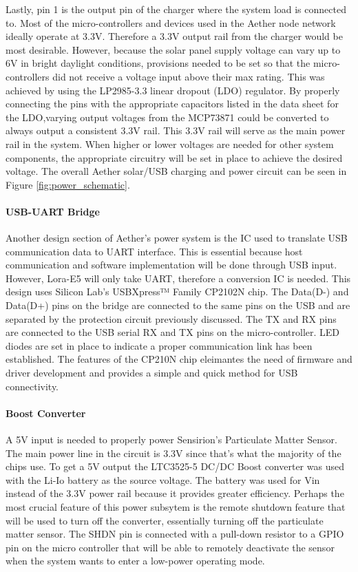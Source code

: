 Lastly, pin 1 is the output pin of the charger where the system load is connected to. Most of the micro-controllers and devices used in the Aether node network ideally operate at 3.3V. Therefore a 3.3V output rail from the charger would be most desirable. However, because the solar panel supply voltage can vary up to 6V in bright daylight conditions, provisions needed to be set so that the micro-controllers did not receive a voltage input above their max rating. This was achieved by using the LP2985-3.3 linear dropout (LDO) regulator. By properly connecting the pins with the appropriate capacitors listed in the data sheet for the LDO,varying output voltages from the MCP73871 could be converted to always output a consistent 3.3V rail. This 3.3V rail will serve as the main power rail in the system. When higher or lower voltages are needed for other system components, the appropriate circuitry will be set in place to achieve the desired voltage. The overall Aether solar/USB charging and power circuit can be seen in Figure \ref{fig:power_schematic}.
\paragraph{USB-UART Bridge}
Another design section of Aether's power system is the IC used to translate USB communication data to UART interface. This is essential because host communication and software implementation will be done through USB input. However, Lora-E5 will only take UART, therefore a conversion IC is needed. This design uses Silicon Lab's USBXpress™ Family CP2102N chip. The Data(D-) and Data(D+) pins on the bridge are connected to the same pins on the USB and are separated by the protection circuit previously discussed. The TX and RX pins are connected to the USB serial RX and TX pins on the micro-controller. LED diodes are set in place to indicate a proper communication link has been established. The features of the CP210N chip eleimantes the need of firmware and driver development and provides a simple and quick method for USB connectivity.
\paragraph{Boost Converter}
A 5V input is needed to properly power Sensirion's Particulate Matter Sensor. The main power line in the circuit is 3.3V since that's what the majority of the chips use. To get a 5V output the LTC3525-5 DC/DC Boost converter was used with the Li-Io battery as the source voltage. The battery was used for Vin instead of the 3.3V power rail because it provides greater efficiency. Perhaps the most crucial feature of this power subsytem is the remote shutdown feature that will be used to turn off the converter, essentially turning off the particulate matter sensor. The SHDN pin is connected with a pull-down resistor to a GPIO pin on the micro controller that will be able to remotely deactivate the sensor when the system wants to enter a low-power operating mode. 

